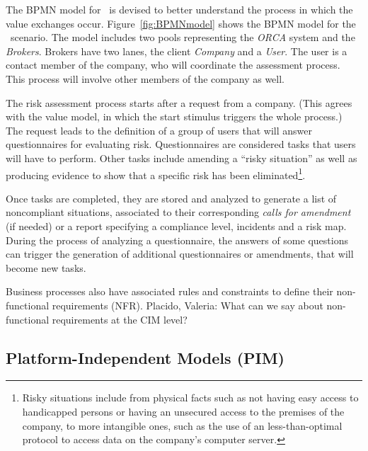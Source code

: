 The BPMN model for \FlyingPig\ is devised to better understand the process in which the value exchanges occur.
Figure~\ref{fig:BPMNmodel} shows the BPMN model
for the \FlyingPig\ scenario. 
The model includes two pools representing the \textsl{ORCA} system and the \textsl{Brokers}. 
Brokers have two lanes, the client \textsl{Company} and a \textsl{User}. 
The user is a contact member of the company, who will coordinate the assessment process. 
This process will involve other members of the company as well.

The risk assessment process starts after a request from a company.
(This agrees with the value model, in which the start stimulus triggers the whole process.)
The request leads to the definition of a group of users that will answer questionnaires for evaluating risk.
Questionnaires are considered tasks that users will have to perform. 
Other tasks include amending a ``risky situation'' as well as producing evidence to show that a specific risk has been eliminated\footnote{Risky situations include from physical facts such as not having easy access to handicapped persons or having an unsecured access to the premises of the company, to more intangible ones, such as the use of an less-than-optimal protocol to access data on the company's computer server.}.

Once tasks are completed, they are stored and analyzed to generate a list of noncompliant situations, associated to their corresponding \textit{calls for amendment} (if needed) or a report specifying a compliance level, incidents and a risk map.
During the process of analyzing a questionnaire, the answers of some questions can trigger the generation of additional questionnaires or amendments, that will become new tasks.  

Business processes also have associated rules and constraints to define their non-functional requirements (NFR).
{\color{red}
Placido, Valeria: What can we say about non-functional requirements at the CIM level?
}
\subsection{Platform-Independent Models (PIM)}

